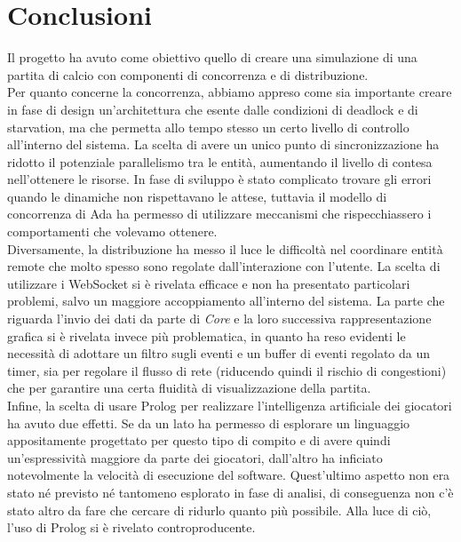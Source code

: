 
\section{Conclusioni}
\label{sec:conclusioni}

Il progetto ha avuto come obiettivo quello di creare una simulazione di una partita di calcio con componenti di concorrenza e di distribuzione.\\

Per quanto concerne la concorrenza, abbiamo appreso come sia importante creare in fase di design un'architettura che esente dalle condizioni di deadlock e di starvation, ma che permetta allo tempo stesso un certo livello di controllo all'interno del sistema. La scelta di avere un unico punto di sincronizzazione ha ridotto il potenziale parallelismo tra le entità, aumentando il livello di contesa nell'ottenere le risorse. In fase di sviluppo è stato complicato trovare gli errori quando le dinamiche non rispettavano le attese, tuttavia il modello di concorrenza di Ada ha permesso di utilizzare meccanismi che rispecchiassero i comportamenti che volevamo ottenere.\\

Diversamente, la distribuzione ha messo il luce le difficoltà nel coordinare entità remote che molto spesso sono regolate dall'interazione con l'utente. La scelta di utilizzare i WebSocket si è rivelata efficace e non ha presentato particolari problemi, salvo un maggiore accoppiamento all'interno del sistema. La parte che riguarda l'invio dei dati da parte di \emph{Core} e la loro successiva rappresentazione grafica si è rivelata invece più problematica, in quanto ha reso evidenti le necessità di adottare un filtro sugli eventi e un buffer di eventi regolato da un timer, sia per regolare il flusso di rete (riducendo quindi il rischio di congestioni) che per garantire una certa fluidità di visualizzazione della partita.\\

Infine, la scelta di usare Prolog per realizzare l'intelligenza artificiale dei giocatori ha avuto due effetti. Se da un lato ha permesso di esplorare un linguaggio appositamente progettato per questo tipo di compito e di avere quindi un'espressività maggiore da parte dei giocatori, dall'altro ha inficiato notevolmente la velocità di esecuzione del software. Quest'ultimo aspetto non era stato né previsto né tantomeno esplorato in fase di analisi, di conseguenza non c'è stato altro da fare che cercare di ridurlo quanto più possibile. Alla luce di ciò, l'uso di Prolog si è rivelato controproducente.\\